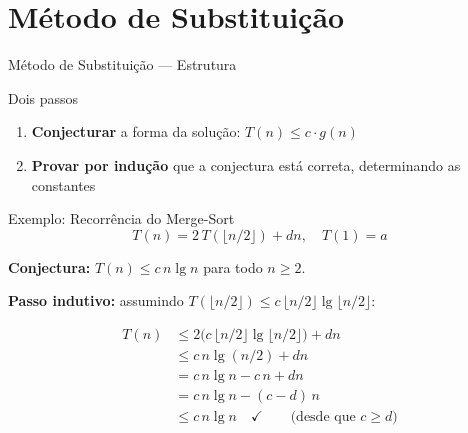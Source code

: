 \documentclass[aspectratio=169]{beamer}
\newcommand{\impt}[1]{\textcolor{maccent}{\textbf{#1}}}
\begin{document}
\section{Método de Substituição}

\begin{frame}{Método de Substituição --- Estrutura}
\begin{block}{Dois passos}
\begin{enumerate}
    \item \impt{Conjecturar} a forma da solução: $T(n) \leq c \cdot g(n)$
    \pause
    \item \impt{Provar por indução} que a conjectura está correta, determinando as constantes
\end{enumerate}
\end{block}
\end{frame}


\begin{frame}{Exemplo: Recorrência do Merge-Sort}
\[
T(n) = 2\,T(\lfloor n/2 \rfloor) + dn, \quad T(1) = a
\]

\vspace{0.2cm}

\textbf{Conjectura:} $T(n) \leq c\,n\lg n$ para todo $n \geq 2$.

\vspace{0.3cm}
\pause

\textbf{Passo indutivo:} assumindo $T(\lfloor n/2 \rfloor) \leq c\,\lfloor n/2 \rfloor \lg \lfloor n/2 \rfloor$:

\begin{align*}
T(n) &\leq 2\bigl(c\,\lfloor n/2 \rfloor \lg \lfloor n/2 \rfloor\bigr) + dn \\
     &\leq c\,n\lg(n/2) + dn \\
     &= c\,n\lg n - c\,n + dn \\
     &= c\,n\lg n - (c - d)\,n \\
     &\leq c\,n\lg n \quad\checkmark \qquad \text{(desde que } c \geq d\text{)}
\end{align*}
\end{frame}

\end{document}
